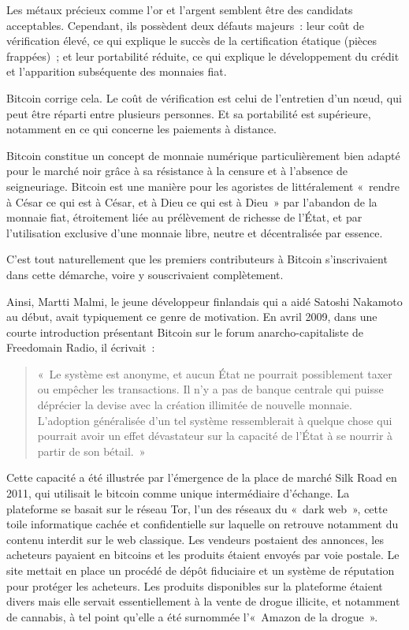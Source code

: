 Les métaux précieux comme l'or et l'argent semblent être des candidats acceptables. Cependant, ils possèdent deux défauts majeurs~: leur coût de vérification élevé, ce qui explique le succès de la certification étatique (pièces frappées)~; et leur portabilité réduite, ce qui explique le développement du crédit et l'apparition subséquente des monnaies fiat.

Bitcoin corrige cela. Le coût de vérification est celui de l'entretien d'un nœud, qui peut être réparti entre plusieurs personnes. Et sa portabilité est supérieure, notamment en ce qui concerne les paiements à distance.

Bitcoin constitue un concept de monnaie numérique particulièrement bien adapté pour le marché noir grâce à sa résistance à la censure et à l'absence de seigneuriage. Bitcoin est une manière pour les agoristes de littéralement «~rendre à César ce qui est à César, et à Dieu ce qui est à Dieu~» par l'abandon de la monnaie fiat, étroitement liée au prélèvement de richesse de l'État, et par l'utilisation exclusive d'une monnaie libre, neutre et décentralisée par essence.

C'est tout naturellement que les premiers contributeurs à Bitcoin s'inscrivaient dans cette démarche, voire y souscrivaient complètement.

Ainsi, Martti Malmi, le jeune développeur finlandais qui a aidé Satoshi Nakamoto au début, avait typiquement ce genre de motivation. En avril 2009, dans une courte introduction présentant Bitcoin sur le forum anarcho-capitaliste de Freedomain Radio, il écrivait~:

\begin{quote}
«~Le système est anonyme, et aucun État ne pourrait possiblement taxer ou empêcher les transactions. Il n'y a pas de banque centrale qui puisse déprécier la devise avec la création illimitée de nouvelle monnaie. L'adoption généralisée d'un tel système ressemblerait à quelque chose qui pourrait avoir un effet dévastateur sur la capacité de l'État à se nourrir à partir de son bétail.~»
\end{quote}

Cette capacité a été illustrée par l'émergence de la place de marché Silk Road en 2011, qui utilisait le bitcoin comme unique intermédiaire d'échange. La plateforme se basait sur le réseau Tor, l'un des réseaux du «~dark web~», cette toile informatique cachée et confidentielle sur laquelle on retrouve notamment du contenu interdit sur le web classique. Les vendeurs postaient des annonces, les acheteurs payaient en bitcoins et les produits étaient envoyés par voie postale. Le site mettait en place un procédé de dépôt fiduciaire et un système de réputation pour protéger les acheteurs. Les produits disponibles sur la plateforme étaient divers mais elle servait essentiellement à la vente de drogue illicite, et notamment de cannabis, à tel point qu'elle a été surnommée l'«~Amazon de la drogue~».

